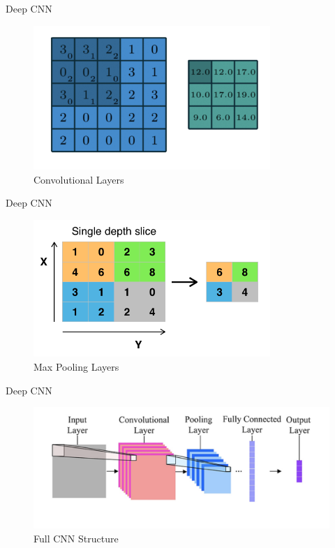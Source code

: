 \begin{frame}{Deep CNN}
\begin{figure}
    \centering
    \includegraphics[width=0.8\textwidth]{img/convlayer2.png}
    \caption{Convolutional Layers}
\end{figure}
\end{frame}

\begin{frame}{Deep CNN}
\begin{figure}
    \centering
    \includegraphics[width=0.8\textwidth]{img/Max_pooling.png}
    \caption{Max Pooling Layers}
\end{figure}
\end{frame}

\begin{frame}{Deep CNN}
\begin{figure}
    \centering
    \includegraphics[width=1\textwidth]{img/cnn_structure.png}
    \caption{Full CNN Structure}
\end{figure}
\end{frame}